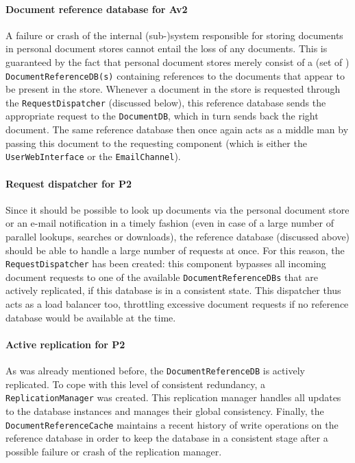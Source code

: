\documentclass[a4paper,10pt]{article}
\begin{document}
\paragraph{Document reference database for Av2}
A failure or crash of the internal (sub-)system responsible for storing documents in personal document stores cannot entail the loss of any documents. This is guaranteed by the fact that personal document stores merely consist of a (set of ) \texttt{DocumentReferenceDB(s)} containing references to the documents that appear to be present in the store. Whenever a document in the store is requested through the \texttt{RequestDispatcher} (discussed below), this reference database sends the appropriate request to the \texttt{DocumentDB}, which in turn sends back the right document. The same reference database then once again acts as a middle man by passing this document to the requesting component (which is either the \texttt{UserWebInterface} or the \texttt{EmailChannel}).


\paragraph{Request dispatcher for P2}
Since it should be possible to look up documents via the personal document store or an e-mail notification in a timely fashion (even in case of a large number of parallel lookups, searches or downloads), the reference database (discussed above) should be able to handle a large number of requests at once. For this reason, the \texttt{RequestDispatcher} has been created: this component bypasses all incoming document requests to one of the available \texttt{DocumentReferenceDBs} that are actively replicated, if this database is in a consistent state. This dispatcher thus acts as a load balancer too, throttling excessive document requests if no reference database would be available at the time.

\paragraph{Active replication for P2}
As was already mentioned before, the \texttt{DocumentReferenceDB} is actively replicated. To cope with this level of consistent redundancy, a \texttt{ReplicationManager} was created. This replication manager handles all updates to the database instances and manages their global consistency. Finally, the \texttt{DocumentReferenceCache} maintains a recent history of write operations on the reference database in order to keep the database in a consistent stage after a possible failure or crash of the replication manager.
\end{document}

